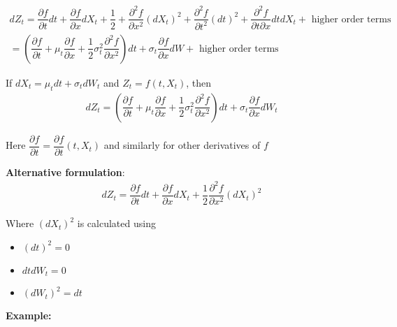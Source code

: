 \begin{equation*}
  \begin{gathered}
    dZ_t = \dfrac{\partial f}{\partial t} dt + \dfrac{\partial f}{\partial x}dX_t+\dfrac{1}{2}+\dfrac{\partial^2f}{\partial x^2}(dX_t)^2 + \dfrac{\partial^2f}{\partial t^2}(dt)^2+ \dfrac{\partial^2f}{\partial t\partial x}dtdX_t+\text{ higher order terms}\\
    = \left(\dfrac{\partial f}{\partial t}+\mu_t\dfrac{\partial f}{\partial x}+\dfrac{1}{2}\sigma_t^2\dfrac{\partial^2f}{\partial x^2}\right)dt+\sigma_t\dfrac{\partial f}{\partial x}dW+\text{ higher order terms}
  \end{gathered}
\end{equation*}
\par\bigskip
\begin{theo}{}
  If $dX_t = \mu_tdt + \sigma_tdW_t$ and $Z_t=f(t,X_t)$, then
  \begin{equation*}
    \begin{gathered}
      dZ_t = \left(\dfrac{\partial f}{\partial t}+\mu_t\dfrac{\partial f}{\partial x}+\dfrac{1}{2}\sigma_t^2\dfrac{\partial^2 f}{\partial x^2}\right)dt+\sigma_t\dfrac{\partial f}{\partial x}dW_t
    \end{gathered}
  \end{equation*}
  \par\bigskip
  \noindent Here $\dfrac{\partial f}{\partial t} = \dfrac{\partial f}{\partial t}(t,X_t)$ and similarly for other derivatives of $f$
\end{theo}
\par\bigskip
\noindent\textbf{Alternative formulation}:
\begin{equation*}
  \begin{gathered}
    dZ_t = \dfrac{\partial f}{\partial t}dt + \dfrac{\partial f}{\partial x}dX_t + \dfrac{1}{2}\dfrac{\partial^2 f}{\partial x^2} (dX_t)^2
  \end{gathered}
\end{equation*}\par
\noindent Where $(dX_t)^2$ is calculated using\par
\begin{itemize}
  \item $(dt)^2 = 0$
  \item $dtdW_t = 0$
  \item $(dW_t)^2=dt$
\end{itemize}
\par\bigskip
\noindent\textbf{Example:}\par
